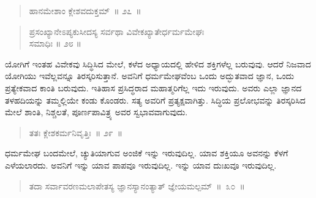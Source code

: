 \vspace{-0.3cm}

\begin{verse}
ಹಾನಮೇಶಾಂ ಕ್ಲೇಶವದುಕ್ತಮ್​~॥ ೨೭~॥
\end{verse}

\vspace{-0.35cm}


\vspace{0.08cm}

\begin{verse}
ಪ್ರಸಂಖ್ಯಾನೇಽಪ್ಯಕುಸೀದಸ್ಯ ಸರ್ವಥಾ ವಿವೇಕಖ್ಯಾತೇರ್ಧರ್ಮಮೇಘಃ \\
\hspace{6cm} ಸಮಾಧಿಃ ॥ ೨೮ ॥
\end{verse}

\vspace{-0.3cm}


\vspace{0.1cm}

ಯೋಗಿಗೆ ಇಂತಹ ವಿವೇಕವು ಸಿದ್ಧಿಸಿದ ಮೇಲೆ, ಕಳೆದ ಅಧ್ಯಾಯದಲ್ಲಿ ಹೇಳಿದ ಶಕ್ತಿಗಳೆಲ್ಲ ಬರುವುವು. ಆದರೆ ನಿಜವಾದ ಯೋಗಿಯು ಇವೆಲ್ಲವನ್ನೂ ತಿರಸ್ಕರಿಸುತ್ತಾನೆ. ಅವನಿಗೆ ಧರ್ಮಮೇಘವೆಂಬ ಒಂದು ಅದ್ಭುತವಾದ ಜ್ಞಾನ, ಒಂದು ಪ್ರತ್ಯೇಕವಾದ ಕಾಂತಿ ಬರುವುದು. ಇತಿಹಾಸ ಪ್ರಸಿದ್ಧರಾದ ಮಹಾತ್ಮರಿಗೆಲ್ಲ ಇದು ಇರುವುದು. ಅವರು ಎಲ್ಲಾ ಜ್ಞಾನದ ತಳಹದಿಯನ್ನು ತಮ್ಮಲ್ಲಿಯೇ ಕಂಡು ಕೊಂಡರು. ಸತ್ಯ ಅವರಿಗೆ ಪ್ರತ್ಯಕ್ಷವಾಗಿತ್ತು. ಸಿದ್ಧಿಯ ಪ್ರಲೋಭವನ್ನು ತಿರಸ್ಕರಿಸಿದ ಮೇಲೆ ಶಾಂತಿ, ನಿಶ್ಚಲತೆ, ಪೂರ್ಣಪಾವಿತ್ರ್ಯ ಅವರ ಸ್ವಭಾವವಾಗುವುದು. 

\vspace{-0.2cm}

\begin{verse}
ತತಃ ಕ್ಲೇಶಕರ್ಮನಿವೃತ್ತಿಃ~॥ ೨೯~॥
\end{verse}

\vspace{-0.3cm}


\vfill\eject	

ಧರ್ಮಮೇಘ ಬಂದಮೇಲೆ, ಚ್ಯುತಿಯಾಗುವ ಅಂಜಿಕೆ ಇನ್ನು ಇರುವುದಿಲ್ಲ. ಯಾವ ಶಕ್ತಿಯೂ ಅವನನ್ನು ಕೆಳಗೆ ಎಳೆಯಲಾರದು. ಅವನಿಗೆ ಇನ್ನು ಯಾವ ಪಾಪವೂ ಇರುವುದಿಲ್ಲ. ಇನ್ನು ಯಾವ ದುಃಖವೂ ಇರುವುದಿಲ್ಲ. 

\vspace{-0.2cm}

\begin{verse}
ತದಾ ಸರ್ವಾವರಣಮಲಾಪೇತಸ್ಯ ಜ್ಞಾನಸ್ಯಾನಂತ್ಯಾತ್​  ಜ್ಞೇಯಮಲ್ಪಮ್​~॥~೩೦~॥
\end{verse}

